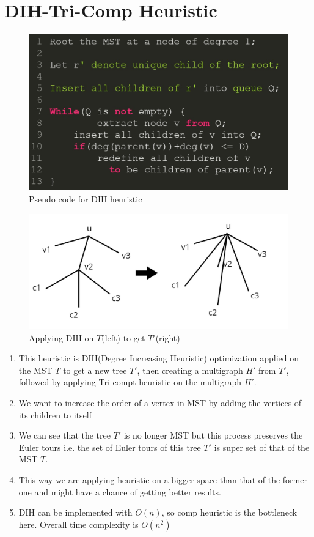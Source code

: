 \section{DIH-Tri-Comp Heuristic}
\begin{figure}[h]
    \centering
    \includegraphics[scale=0.3]{5.jpg}
    \caption{Pseudo code for DIH heuristic}
\end{figure}
\begin{figure}[h]
    \centering
    \includegraphics[scale=0.3]{4.jpg}
    \caption{Applying DIH on $T$(left) to get $T'$(right)}
\end{figure}
\begin{enumerate}
    \item This heuristic is DIH(Degree Increasing Heuristic) optimization applied on the MST $T$ to get a new tree $T'$, then creating a multigraph $H'$ from $T'$, followed by applying Tri-compt heuristic on the multigraph $H'$.
    \item We want to increase the order of a vertex in MST by adding the vertices  of its children to itself
    \item We can see that the tree $T'$ is no longer MST but this process preserves the Euler tours i.e. the set of Euler tours of this tree $T'$ is super set of that of the MST $T$.
    \item This way we are applying heuristic on a bigger space than that of the former one and might have a chance of getting better results.
    \item  DIH can be implemented with $O(n)$, so comp heuristic is the bottleneck here. Overall time complexity is $O(n^2)$
\end{enumerate}
\vspace{7in}
